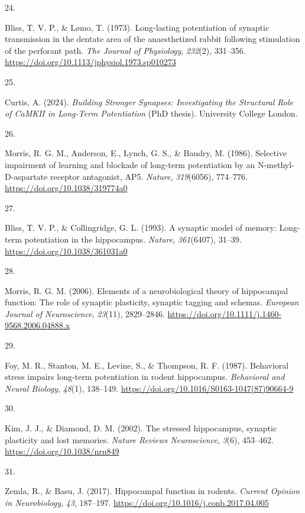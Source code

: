 \documentclass[
  11pt,
  letterpaper,
]{scrreprt}
\newlength{\cslhangindent}
\newlength{\csllabelwidth}
\newenvironment{CSLReferences}[2] %
 {\begin{list}{}{%
  \setlength{\itemindent}{0pt}
  \setlength{\leftmargin}{0pt}
  \setlength{\parsep}{0pt}
  \ifodd #1
   \setlength{\leftmargin}{\cslhangindent}
   \setlength{\itemindent}{-1\cslhangindent}
  \fi
  \setlength{\itemsep}{#2\baselineskip}}}
 {\end{list}}
\newcommand{\CSLLeftMargin}[1]{\parbox[t]{\csllabelwidth}{\strut#1\strut}}
\newcommand{\CSLRightInline}[1]{\parbox[t]{\linewidth - \csllabelwidth}{\strut#1\strut}}
\begin{document}
\begin{CSLReferences}{0}{0}
\CSLLeftMargin{24. }%
\CSLRightInline{Bliss, T. V. P., \& Lømo, T. (1973). Long-lasting
potentiation of synaptic transmission in the dentate area of the
anaesthetized rabbit following stimulation of the perforant path.
\emph{The Journal of Physiology}, \emph{232}(2), 331--356.
\url{https://doi.org/10.1113/jphysiol.1973.sp010273}}

\CSLLeftMargin{25. }%
\CSLRightInline{Curtis, A. (2024). \emph{Building {Stronger Synapses}:
{Investigating} the {Structural Role} of {CaMKII} in {Long-Term
Potentiation}} (PhD thesis). University College London.}

\CSLLeftMargin{26. }%
\CSLRightInline{Morris, R. G. M., Anderson, E., Lynch, G. S., \& Baudry,
M. (1986). Selective impairment of learning and blockade of long-term
potentiation by an {N-methyl-D-aspartate} receptor antagonist, {AP5}.
\emph{Nature}, \emph{319}(6056), 774--776.
\url{https://doi.org/10.1038/319774a0}}

\CSLLeftMargin{27. }%
\CSLRightInline{Bliss, T. V. P., \& Collingridge, G. L. (1993). A
synaptic model of memory: Long-term potentiation in the hippocampus.
\emph{Nature}, \emph{361}(6407), 31--39.
\url{https://doi.org/10.1038/361031a0}}

\CSLLeftMargin{28. }%
\CSLRightInline{Morris, R. G. M. (2006). Elements of a neurobiological
theory of hippocampal function: The role of synaptic plasticity,
synaptic tagging and schemas. \emph{European Journal of Neuroscience},
\emph{23}(11), 2829--2846.
\url{https://doi.org/10.1111/j.1460-9568.2006.04888.x}}

\CSLLeftMargin{29. }%
\CSLRightInline{Foy, M. R., Stanton, M. E., Levine, S., \& Thompson, R.
F. (1987). Behavioral stress impairs long-term potentiation in rodent
hippocampus. \emph{Behavioral and Neural Biology}, \emph{48}(1),
138--149. \url{https://doi.org/10.1016/S0163-1047(87)90664-9}}

\CSLLeftMargin{30. }%
\CSLRightInline{Kim, J. J., \& Diamond, D. M. (2002). The stressed
hippocampus, synaptic plasticity and lost memories. \emph{Nature Reviews
Neuroscience}, \emph{3}(6), 453--462.
\url{https://doi.org/10.1038/nrn849}}

\CSLLeftMargin{31. }%
\CSLRightInline{Zemla, R., \& Basu, J. (2017). Hippocampal function in
rodents. \emph{Current Opinion in Neurobiology}, \emph{43}, 187--197.
\url{https://doi.org/10.1016/j.conb.2017.04.005}}


\end{CSLReferences}
\end{document}
